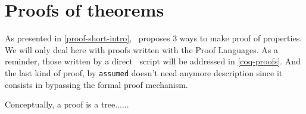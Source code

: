 \section{Proofs of theorems}
As presented in \ref{proof-short-intro}, \focal\ proposes 3 ways to
make proof of properties. We will only deal here with proofs written
with the \focal Proof Languages. As a reminder, those written by a
direct \coq\ script will be addressed in \ref{coq-proofs}. And the
last kind of proof, by {\tt assumed} doesn't need anymore description
since it consists in bypassing the formal proof mechanism.

Conceptually, a proof is a tree......
